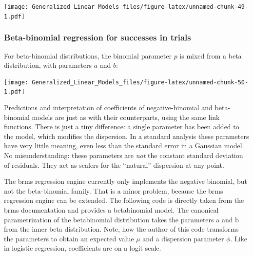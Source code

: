 \documentclass[]{svmono}
\newenvironment{Shaded}{\begin{snugshade}}{\end{snugshade}}
\newcommand{\KeywordTok}[1]{\textcolor[rgb]{0.13,0.29,0.53}{\textbf{#1}}}
\newcommand{\DecValTok}[1]{\textcolor[rgb]{0.00,0.00,0.81}{#1}}
\newcommand{\StringTok}[1]{\textcolor[rgb]{0.31,0.60,0.02}{#1}}
\newcommand{\ControlFlowTok}[1]{\textcolor[rgb]{0.13,0.29,0.53}{\textbf{#1}}}
\newcommand{\OperatorTok}[1]{\textcolor[rgb]{0.81,0.36,0.00}{\textbf{#1}}}
\newcommand{\NormalTok}[1]{#1}
\theoremstyle{definition}
\theoremstyle{definition}
\theoremstyle{definition}
\theoremstyle{remark}
\begin{document}
\texttt{[image: Generalized\_Linear\_Models\_files/figure-latex/unnamed-chunk-49-1.pdf]}

\subsubsection{Beta-binomial regression for successes in
trials}\label{beta-binomial-regression-for-successes-in-trials}

For beta-binomial distributions, the binomial parameter \(p\) is mixed
from a beta distribution, with parameters \(a\) and \(b\):

\begin{Shaded}
\end{Shaded}

\texttt{[image: Generalized\_Linear\_Models\_files/figure-latex/unnamed-chunk-50-1.pdf]}

Predictions and interpretation of coefficients of negative-binomial and
beta-binomial models are just as with their counterparts, using the same
link functions. There is just a tiny difference: a single parameter has
been added to the model, which modifies the dispersion. In a standard
analysis these parameters have very little meaning, even less than the
standard error in a Gaussian model. No misunderstanding: these
parameters are \emph{not} the constant standard deviation of residuals.
They act as scalers for the ``natural'' dispersion at any point.

The brms regression engine currently only implements the negative
binomial, but not the beta-binomial family. That is a minor problem,
because the brms regression engine can be extended. The following code
is directly taken from the brms documentation and provides a
betabinomial model. The canonical parametrization of the betabinomial
distribution takes the parameters a and b from the inner beta
distribution. Note, how the author of this code transforms the
parameters to obtain an expected value \(\mu\) and a dispersion
parameter \(\phi\). Like in logistic regression, coefficients are on a
logit scale.
\end{document}
